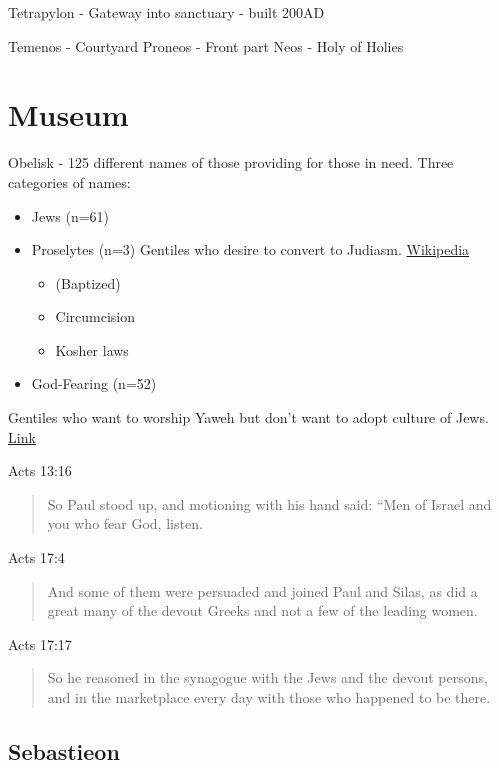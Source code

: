\documentclass[
]{book}
\providecommand{\tightlist}{%
  \setlength{\itemsep}{0pt}\setlength{\parskip}{0pt}}
\begin{document}
Tetrapylon - Gateway into sanctuary - built 200AD

Temenos - Courtyard
Proneos - Front part
Neos - Holy of Holies

\hypertarget{museum}{%
\chapter{Museum}\label{museum}}

Obelisk - 125 different names of those providing for those in need.
Three categories of names:

\begin{itemize}
\item
  Jews (n=61)
\item
  Proselytes (n=3) Gentiles who desire to convert to Judiasm. \href{https://en.wikipedia.org/wiki/Proselyte}{Wikipedia}

  \begin{itemize}
  \tightlist
  \item
    (Baptized)
  \item
    Circumcision
  \item
    Kosher laws
  \end{itemize}
\item
  God-Fearing (n=52)
\end{itemize}

Gentiles who want to worship Yaweh but don't want to adopt culture of Jews. \href{https://www.biblestudymagazine.com/bible-study-magazine-blog/2016/6/3/who-were-the-god-fearers}{Link}

Acts 13:16

\begin{quote}
So Paul stood up, and motioning with his hand said:
``Men of Israel and you who fear God, listen.
\end{quote}

Acts 17:4

\begin{quote}
And some of them were persuaded and joined Paul and Silas, as did a great many of the devout Greeks and not a few of the leading women.
\end{quote}

Acts 17:17

\begin{quote}
So he reasoned in the synagogue with the Jews and the devout persons, and in the marketplace every day with those who happened to be there.
\end{quote}

\hypertarget{sebastieon}{%
\section{Sebastieon}\label{sebastieon}}
\end{document}
